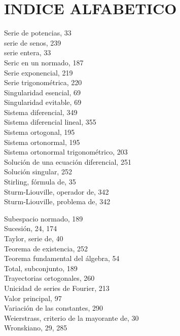 \documentclass[10pt]{article}
\theoremstyle{plain}
\theoremstyle{definition}
\theoremstyle{remark}
\begin{document}
\section*{INDICE ALFABETICO}
Serie de potencias, 33\\
serie de senos, 239\\
serie entera, 33\\
Seric en un normado, 187\\
Serie exponencial, 219\\
Serie trigonométrica, 220\\
Singularidad esencial, 69\\
Singularidad evitable, 69\\
Sistema diferencial, 349\\
Sistema diferencial lineal, 355\\
Sistema ortogonal, 195\\
Sistema ortonormal, 195\\
Sistema ortonormal trigonométrico, 203\\
Solución de una ecuación diferencial, 251\\
Solución singular, 252\\
Stirling, fórmula de, 35\\
Sturm-Liouville, operador de, 342\\
Sturm-Liouville, problema de, 342

Subespacio normado, 189\\
Sucesión, 24, 174\\
Taylor, serie de, 40\\
Teorema de existencia, 252\\
Teorema fundamental del álgebra, 54\\
Total, subconjunto, 189\\
Trayectorias ortogonales, 260\\
Unicidad de series de Fourier, 213\\
Valor principal, 97\\
Variación de las constantes, 290\\
Weierstrass, criterio de la mayorante de, 30\\
Wronskiano, 29, 285
\end{document}
